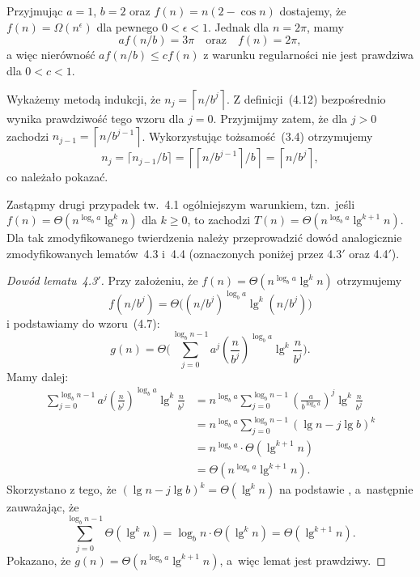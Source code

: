 \exercise %
Przyjmując $a=1$, $b=2$ oraz $f(n)=n(2-\cos n)$ dostajemy, że $f(n)=\Omega(n^\epsilon)$ dla pewnego $0<\epsilon<1$. Jednak dla $n=2\pi$, mamy
\[
    af(n/b) = 3\pi \quad\text{oraz}\quad f(n) = 2\pi,
\]
a więc nierówność $af(n/b)\le cf(n)$ z warunku regularności nie jest prawdziwa dla $0<c<1$.


\exercise %
Wykażemy metodą indukcji, że $n_j=\left\lceil n/b^j\right\rceil$. Z definicji~(4.12) bezpośrednio wynika prawdziwość tego wzoru dla $j=0$. Przyjmijmy zatem, że dla $j>0$ zachodzi $n_{j-1}=\left\lceil n/b^{j-1}\right\rceil$. Wykorzystując tożsamość~(3.4) otrzymujemy
\[
	n_j = \lceil n_{j-1}/b\rceil = \left\lceil\left\lceil n/b^{j-1}\right\rceil\!/b\right\rceil = \left\lceil n/b^j\right\rceil,
\]
co należało pokazać.

\exercise %
Zastąpmy drugi przypadek tw.~4.1 ogólniejszym warunkiem, tzn.\ jeśli $f(n)=\Theta(n^{\log_ba}\lg^kn)$ dla $k\ge0$, to zachodzi $T(n)=\Theta(n^{\log_ba}\lg^{k+1}n)$. Dla tak zmodyfikowanego twierdzenia należy przeprowadzić dowód analogicznie zmodyfikowanych lematów~4.3 i~4.4 (oznaczonych poniżej przez 4.3$'$ oraz 4.4$'$).

\begin{proof}[Dowód lematu~4.3\/$'$]
	Przy założeniu, że $f(n)=\Theta(n^{\log_ba}\lg^kn)$ otrzymujemy
	\[
		f(n/b^j)=\Theta\bigl((n/b^j)^{\log_ba}\lg^k(n/b^j)\bigr)
	\]
	i podstawiamy do wzoru~(4.7):
	\[
		g(n) = \Theta\biggl(\sum_{j=0}^{\log_bn-1}a^j\left(\frac{n}{b^j}\right)^{\log_ba}\lg^k\frac{n}{b^j}\biggr).
	\]
	Mamy dalej:
	\begin{align*}
		\sum_{j=0}^{\log_bn-1}a^j\left(\frac{n}{b^j}\right)^{\log_ba}\lg^k\frac{n}{b^j} &= n^{\log_ba}\sum_{j=0}^{\log_bn-1}\left(\frac{a}{b^{\log_ba}}\right)^j\lg^k\frac{n}{b^j} \\
		&= n^{\log_ba}\sum_{j=0}^{\log_bn-1}(\lg n-j\lg b)^k \\
		&= n^{\log_ba}\cdot\Theta(\lg^{k+1}n) \\
		&= \Theta(n^{\log_ba}\lg^{k+1}n).
	\end{align*}
	Skorzystano z tego, że $(\lg n-j\lg b)^k=\Theta(\lg^kn)$ na podstawie , a~następnie zauważając, że
	\[
		\sum_{j=0}^{\log_bn-1}\Theta(\lg^kn) = \log_bn\cdot\Theta(\lg^kn) = \Theta(\lg^{k+1}n).
	\]
	Pokazano, że $g(n)=\Theta(n^{\log_ba}\lg^{k+1}n)$, a~więc lemat jest prawdziwy.
\end{proof}

